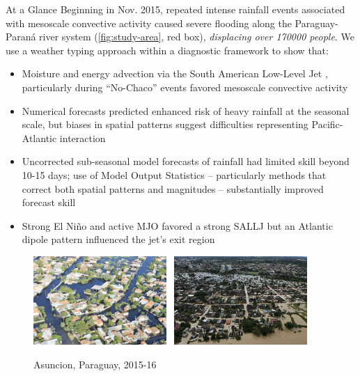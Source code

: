 \begin{block}{At a Glance}
  Beginning in Nov. 2015, repeated intense rainfall events associated with mesoscale convective activity caused severe flooding along the Paraguay-Paran\'{a} river system (\cref{fig:study-area}, red box), \emph{displacing over 170000 people}.
  We use a weather typing approach within a diagnostic framework to show that:
  \begin{itemize}
    \item Moisture and energy advection via the South American Low-Level Jet \cite[SALLJ;][]{Marengo:2012cm}, particularly during ``No-Chaco'' events \cite{Vera:2006ib} favored mesoscale convective activity
    \item Numerical forecasts predicted enhanced risk of heavy rainfall at the seasonal scale, but biases in spatial patterns suggest difficulties representing Pacific-Atlantic interaction
    \item Uncorrected sub-seasonal model forecasts of rainfall had limited skill beyond 10-15 days; use of Model Output Statistics -- particularly methods that correct both spatial patterns and magnitudes -- substantially improved forecast skill
    \item Strong El Ni\~{n}o and active MJO favored a strong SALLJ but an Atlantic dipole pattern influenced the jet's exit region
  \end{itemize}
  \begin{mdframed}
  \begin{figure}
  	\noindent\includegraphics[width=0.45\textwidth]{asuncion-inundaciones.jpg}~
    \noindent\includegraphics[width=0.45\textwidth]{rio-py-banados.jpg}
  	\caption{
  		Asuncion, Paraguay, 2015-16
  	}
    \label{fig:floods}
  \end{figure}
  \end{mdframed}
\end{block}
